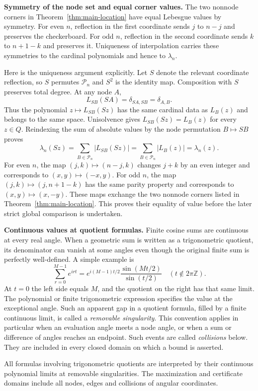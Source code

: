 \noindent\textbf{Symmetry of the node set and equal corner values.}
The two nonnode corners in Theorem~\ref{thm:main-location} have equal
Lebesgue values by symmetry. For even $n$, reflection in the first
coordinate sends $j$ to $n-j$ and preserves the checkerboard. For odd
$n$, reflection in the second coordinate sends $k$ to $n+1-k$ and
preserves it. Uniqueness of interpolation carries these symmetries to
the cardinal polynomials and hence to $\lambda_n$.

Here is the uniqueness argument explicitly. Let $S$ denote the relevant
coordinate reflection, so $S$ permutes $\mathcal P_n$ and $S^2$ is the
identity map. Composition with $S$ preserves total degree. At any node
$A$,
\[
 L_{SB}(SA)=\delta_{SA,SB}=\delta_{A,B}.
\]
Thus the polynomial $z\mapsto L_{SB}(Sz)$ has the same cardinal data
as $L_B(z)$ and belongs to the same space. Unisolvence gives
$L_{SB}(Sz)=L_B(z)$ for every $z\in Q$. Reindexing the sum of absolute
values by the node permutation $B\mapsto SB$ proves
\[
 \lambda_n(Sz)=\sum_{B\in\mathcal P_n}|L_{SB}(Sz)|
              =\sum_{B\in\mathcal P_n}|L_B(z)|=\lambda_n(z).
\]
For even $n$, the map $(j,k)\mapsto(n-j,k)$ changes $j+k$ by an even
integer and corresponds to $(x,y)\mapsto(-x,y)$. For odd $n$, the map
$(j,k)\mapsto(j,n+1-k)$ has the same parity property and corresponds
to $(x,y)\mapsto(x,-y)$. These maps exchange the two nonnode corners
listed in Theorem~\ref{thm:main-location}. This proves their equality
of value before the later strict global comparison is undertaken.

\noindent\textbf{Continuous values at quotient formulas.}
Finite cosine sums are continuous at every real angle. When a geometric
sum is written as a trigonometric quotient, its denominator can vanish
at some angles even though the original finite sum is perfectly
well-defined. A simple example is
\[
 \sum_{r=0}^{M-1}e^{irt}
    =e^{i(M-1)t/2}\frac{\sin(Mt/2)}{\sin(t/2)}
      \quad(t\notin2\pi\mathbb Z).
\]
At $t=0$ the left side equals $M$, and the quotient on the right has
that same limit. The polynomial or finite trigonometric expression
specifies the value at the exceptional angle. Such an apparent gap in a
quotient formula, filled by a finite continuous limit, is called a
\emph{removable singularity}. This convention applies
in particular when an evaluation angle meets a node angle, or when a
sum or difference of angles reaches an endpoint. Such events are called
\emph{collisions} below. They are included in every closed domain on
which a bound is asserted.


\begin{remark}
All formulas involving trigonometric quotients are interpreted by their
continuous polynomial limits at removable singularities. The maximization
and certificate domains include all nodes, edges and collisions of angular
coordinates.
\end{remark}
